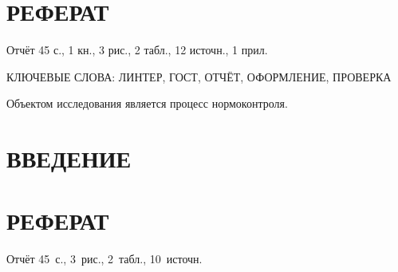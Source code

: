 \section*{РЕФЕРАТ}

Отчёт 45 с., 1 кн., 3 рис., 2 табл., 12 источн., 1 прил.

КЛЮЧЕВЫЕ СЛОВА: ЛИНТЕР, ГОСТ, ОТЧЁТ, ОФОРМЛЕНИЕ, ПРОВЕРКА

Объектом исследования является процесс нормоконтроля.

\section*{ВВЕДЕНИЕ}

\section*{РЕФЕРАТ}

Отчёт 45~с., 3~рис., 2~табл., 10~источн.
